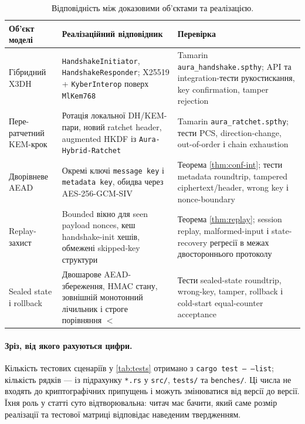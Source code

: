 \documentclass[11pt,a4paper]{article}
\theoremstyle{definition}
\begin{document}
\begin{table}[H]
\centering
\caption{Відповідність між доказовими об'єктами та реалізацією.}
\label{tab:code-proof-map}
\small
\begin{tabularx}{\textwidth}{@{}p{}YY@{}}
\toprule
Об'єкт моделі & Реалізаційний відповідник & Перевірка \\
\midrule
Гібридний X3DH &
\texttt{HandshakeInitiator}, \texttt{HandshakeResponder}; X25519 +
\texttt{KyberInterop} поверх \texttt{MlKem768} &
Tamarin \texttt{aura\_handshake.spthy}; API та integration-тести
рукостискання, key confirmation, tamper rejection \\
\addlinespace
Пере-ратчетний KEM-крок &
Ротація локальної DH/KEM-пари, новий ratchet header, augmented HKDF
із \texttt{Aura-Hybrid-Ratchet} &
Tamarin \texttt{aura\_ratchet.spthy}; тести PCS, direction-change,
out-of-order і chain exhaustion \\
\addlinespace
Дворівневе AEAD &
Окремі ключі \texttt{message key} і \texttt{metadata key}, обидва
через AES-256-GCM-SIV &
Теорема \ref{thm:conf-int}; тести metadata roundtrip, tampered
ciphertext/header, wrong key і nonce-boundary \\
\addlinespace
Replay-захист &
Bounded вікно для seen payload nonces, кеш handshake-init
хешів, обмежені skipped-key структури &
Теорема \ref{thm:replay}; session replay, malformed-input і
state-recovery регресії в межах двостороннього протоколу \\
\addlinespace
Sealed state і rollback &
Двошарове AEAD-збереження, HMAC стану, зовнішній монотонний
лічильник і строге порівняння $<$ &
Тести sealed-state roundtrip, wrong-key, tamper, rollback і cold-start
equal-counter acceptance \\
\bottomrule
\end{tabularx}
\end{table}

\paragraph{Зріз, від якого рахуються цифри.}
Кількість тестових сценаріїв у \cref{tab:tests} отримано з
\texttt{cargo test -- --list}; кількість рядків — із
підрахунку \texttt{*.rs} у \texttt{src/}, \texttt{tests/} та
\texttt{benches/}. Ці числа не входять до криптографічних припущень і
можуть змінюватися від версії до версії. Їхня роль у статті суто
відтворювальна: читач має бачити, який саме розмір реалізації та
тестової матриці відповідає наведеним твердженням.
\end{document}
